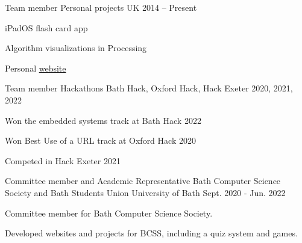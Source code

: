 


\begin{cventries}


\cventry
{Team member} %
{Personal projects} %
{UK} %
{2014 -- Present} %
{ %
\begin{cvitems}
\item {iPadOS flash card app}
\item {Algorithm visualizations in Processing}
\item {Personal \href{https://www.alfierichards.com/}{website}}
\end{cvitems}
}


\cventry
{Team member} %
{Hackathons} %
{Bath Hack, Oxford Hack, Hack Exeter} %
{2020, 2021, 2022} %
{ %
\begin{cvitems}
\item {Won the embedded systems track at Bath Hack 2022}
\item {Won Best Use of a URL track at Oxford Hack 2020}
\item {Competed in Hack Exeter 2021}
\end{cvitems}
}


\cventry
{Committee member and Academic Representative} %
{Bath Computer Science Society and Bath Students Union} %
{University of Bath} %
{Sept. 2020 - Jun. 2022} %
{ %
\begin{cvitems}
\item {Committee member for Bath Computer Science Society.}
\item {Developed websites and projects for BCSS, including a quiz system and games.}
\end{cvitems}
}


\end{cventries}

